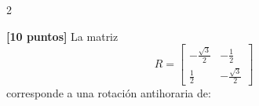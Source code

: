 \documentclass[10pt]{article}
\begin{document}
\begin{multicols}{2}
\begin{question}
            \begin{inlineanswers}
            \end{inlineanswers}
        \end{question}


        \begin{question}
            \textbf{[10 puntos]} La matriz
            \[
            R=
            \begin{bmatrix}
                -\frac{\sqrt3}{2} & -\frac12\\[1mm]
                \frac12 & -\frac{\sqrt3}{2}
            \end{bmatrix}
            \]
            corresponde a una rotación antihoraria de:

            \begin{inlineanswers}
            \end{inlineanswers}
        \end{question}





\end{multicols}
\end{document}
